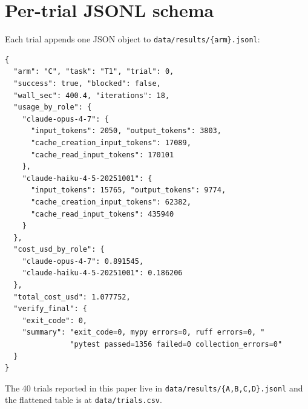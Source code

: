\documentclass[11pt,a4paper]{article}
\begin{document}
\section{Per-trial JSONL schema}
\label{app:trial-schema}

Each trial appends one JSON object to \texttt{data/results/\{arm\}.jsonl}:

\begin{verbatim}
{
  "arm": "C", "task": "T1", "trial": 0,
  "success": true, "blocked": false,
  "wall_sec": 400.4, "iterations": 18,
  "usage_by_role": {
    "claude-opus-4-7": {
      "input_tokens": 2050, "output_tokens": 3803,
      "cache_creation_input_tokens": 17089,
      "cache_read_input_tokens": 170101
    },
    "claude-haiku-4-5-20251001": {
      "input_tokens": 15765, "output_tokens": 9774,
      "cache_creation_input_tokens": 62382,
      "cache_read_input_tokens": 435940
    }
  },
  "cost_usd_by_role": {
    "claude-opus-4-7": 0.891545,
    "claude-haiku-4-5-20251001": 0.186206
  },
  "total_cost_usd": 1.077752,
  "verify_final": {
    "exit_code": 0,
    "summary": "exit_code=0, mypy errors=0, ruff errors=0, "
               "pytest passed=1356 failed=0 collection_errors=0"
  }
}
\end{verbatim}

The 40 trials reported in this paper live in \texttt{data/results/\{A,B,C,D\}.jsonl} and the flattened table is at \texttt{data/trials.csv}.
\end{document}
